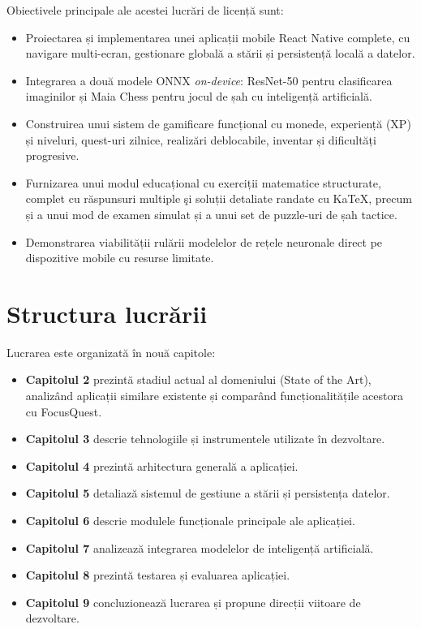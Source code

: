 \documentclass[12pt, a4paper, twoside]{report}
\numberwithin{equation}{section}
\begin{document}
Obiectivele principale ale acestei lucrări de licență sunt:
\begin{itemize}
  \item Proiectarea și implementarea unei aplicații mobile React Native complete, cu navigare
    multi-ecran, gestionare globală a stării și persistență locală a datelor.
  \item Integrarea a două modele ONNX \textit{on-device}: ResNet-50 pentru clasificarea
    imaginilor și Maia Chess pentru jocul de șah cu inteligență artificială.
  \item Construirea unui sistem de gamificare funcțional cu monede, experiență (XP) și
    niveluri, quest-uri zilnice, realizări deblocabile, inventar și dificultăți progresive.
  \item Furnizarea unui modul educațional cu exerciții matematice structurate, complet
    cu răspunsuri multiple şi soluții detaliate randate cu KaTeX, precum și a unui mod de
    examen simulat și a unui set de puzzle-uri de șah tactice.
  \item Demonstrarea viabilității rulării modelelor de rețele neuronale direct pe dispozitive
    mobile cu resurse limitate.
\end{itemize}

\section{Structura lucrării}

Lucrarea este organizată în nouă capitole:
\begin{itemize}
  \item \textbf{Capitolul 2} prezintă stadiul actual al domeniului (State of the Art),
    analizând aplicații similare existente și comparând funcționalitățile acestora cu
    FocusQuest.
  \item \textbf{Capitolul 3} descrie tehnologiile și instrumentele utilizate în dezvoltare.
  \item \textbf{Capitolul 4} prezintă arhitectura generală a aplicației.
  \item \textbf{Capitolul 5} detaliază sistemul de gestiune a stării și persistența datelor.
  \item \textbf{Capitolul 6} descrie modulele funcționale principale ale aplicației.
  \item \textbf{Capitolul 7} analizează integrarea modelelor de inteligență artificială.
  \item \textbf{Capitolul 8} prezintă testarea și evaluarea aplicației.
  \item \textbf{Capitolul 9} concluzionează lucrarea și propune direcții viitoare de
    dezvoltare.
\end{itemize}
\end{document}
